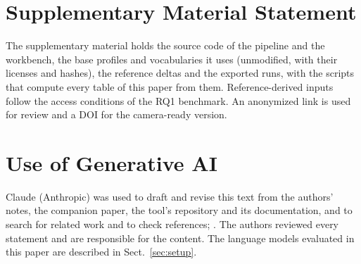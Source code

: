 \section*{Supplementary Material Statement}

 The supplementary material holds the source code of the
pipeline and the workbench, the base profiles and vocabularies it uses (unmodified, with their licenses and
hashes), the reference deltas and the exported runs, with the scripts that compute every table of this paper
from them. Reference-derived inputs follow the access conditions of the RQ1 benchmark. An anonymized link
is used for review and a DOI for the camera-ready version.

\section*{Use of Generative AI}

Claude (Anthropic) was used to draft and revise this text from the authors' notes, the companion paper,
the tool's repository and its documentation, and to search for related work and to check references;
. The authors reviewed every statement and are responsible for the
content. The language models evaluated in this paper are described in Sect.~\ref{sec:setup}.
